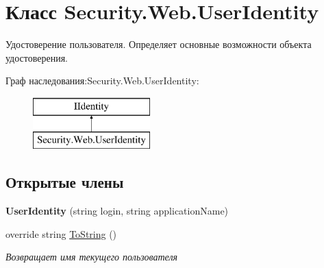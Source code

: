 \hypertarget{class_security_1_1_web_1_1_user_identity}{}\section{Класс Security.\+Web.\+User\+Identity}
\label{class_security_1_1_web_1_1_user_identity}


Удостоверение пользователя. Определяет основные возможности объекта удостоверения.  


Граф наследования\+:Security.\+Web.\+User\+Identity\+:\begin{figure}[H]
\begin{center}
\leavevmode
\includegraphics[height=2.000000cm]{d6/da0/class_security_1_1_web_1_1_user_identity}
\end{center}
\end{figure}
\subsection*{Открытые члены}
\begin{DoxyCompactItemize}
\item 
\mbox{\label{class_security_1_1_web_1_1_user_identity_a447a644ce2e32871ca00e55be99c02ed}} 
{\bfseries User\+Identity} (string login, string application\+Name)
\item 
override string \hyperlink{class_security_1_1_web_1_1_user_identity_a000a7083c53a09f5a6d82ab9f16fc50c}{To\+String} ()
\begin{DoxyCompactList}\small\item\em Возвращает имя текущего пользователя \end{DoxyCompactList}\end{DoxyCompactItemize}
